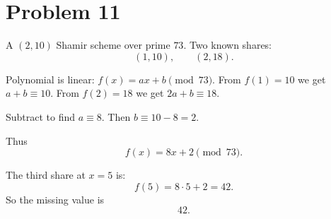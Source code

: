 \section*{Problem 11}

A \((2,10)\) Shamir scheme over prime \(73\). Two known shares:
\[
(1,10),\qquad (2,18).
\]

Polynomial is linear: \(f(x)=ax+b\pmod{73}\).  
From \(f(1)=10\) we get \(a+b\equiv 10\).  
From \(f(2)=18\) we get \(2a+b\equiv 18\).

Subtract to find \(a\equiv 8\).  
Then \(b\equiv 10-8=2\).

Thus
\[
f(x)=8x+2\pmod{73}.
\]

The third share at \(x=5\) is:
\[
f(5)=8\cdot 5+2=42.
\]
So the missing value is
\[
\boxed{42}.
\]
